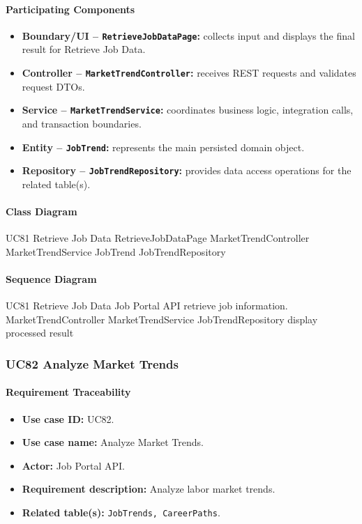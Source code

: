 \paragraph{Participating Components}

\begin{itemize}
    \item \textbf{Boundary/UI -- \texttt{RetrieveJobDataPage}:} collects input and displays the final result for Retrieve Job Data.
    \item \textbf{Controller -- \texttt{MarketTrendController}:} receives REST requests and validates request DTOs.
    \item \textbf{Service -- \texttt{MarketTrendService}:} coordinates business logic, integration calls, and transaction boundaries.
    \item \textbf{Entity -- \texttt{JobTrend}:} represents the main persisted domain object.
    \item \textbf{Repository -- \texttt{JobTrendRepository}:} provides data access operations for the related table(s).
\end{itemize}

\paragraph{Class Diagram}

\ClassDiagram
{UC81 Retrieve Job Data}
{RetrieveJobDataPage}
{MarketTrendController}
{MarketTrendService}
{JobTrend}
{JobTrendRepository}

\paragraph{Sequence Diagram}

\SequenceDiagram
{UC81 Retrieve Job Data}
{Job Portal API}
{retrieve job information.}
{MarketTrendController}
{MarketTrendService}
{JobTrendRepository}
{display processed result}

\subsubsection{UC82 Analyze Market Trends}

\paragraph{Requirement Traceability}

\begin{itemize}
    \item \textbf{Use case ID:} UC82.
    \item \textbf{Use case name:} Analyze Market Trends.
    \item \textbf{Actor:} Job Portal API.
    \item \textbf{Requirement description:} Analyze labor market trends.
    \item \textbf{Related table(s):} \texttt{JobTrends, CareerPaths}.
\end{itemize}

